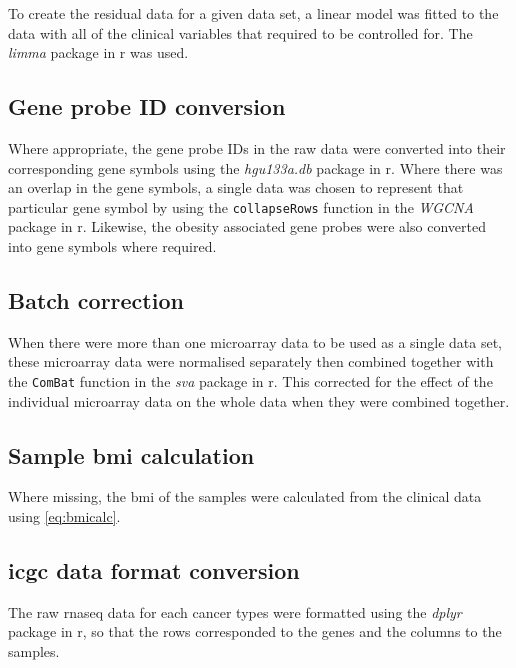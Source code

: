 To create the residual data for a given data set, a linear model was fitted to the data with all of the clinical variables that required to be controlled for.
The \textit{limma} package in \gls{r} was used.

\subsection{Gene probe ID conversion}
\label{sub:gene_probe_id_conversion}

Where appropriate, the gene probe IDs in the raw data were converted into their corresponding gene symbols using the \textit{hgu133a.db} package in \gls{r}.
Where there was an overlap in the gene symbols, a single data was chosen to represent that particular gene symbol by using the \texttt{collapseRows} function in the \textit{WGCNA} package in \gls{r}.
Likewise, the obesity associated gene probes were also converted into gene symbols where required.


\subsection{Batch correction}
\label{sub:batch_correction}

When there were more than one microarray data to be used as a single data set, these microarray data were normalised separately then combined together with the \texttt{ComBat} function in the \textit{sva} package in \gls{r}.
This corrected for the effect of the individual microarray data on the whole data when they were combined together.

\subsection{Sample \gls{bmi} calculation}
\label{sub:sample_bmi_calculation}

Where missing, the \gls{bmi} of the samples were calculated from the clinical data using \cref{eq:bmicalc}.

\subsection{\gls{icgc} data format conversion}
\label{sub:icgc_data_format_conversion}

The raw \gls{rnaseq} data for each cancer types were formatted using the \textit{dplyr} package in \gls{r}, so that the rows corresponded to the genes and the columns to the samples.

